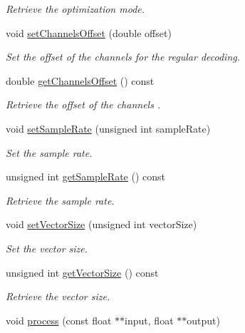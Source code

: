 \begin{DoxyCompactItemize}
\begin{DoxyCompactList}\small\item\em Retrieve the optimization mode. \end{DoxyCompactList}\item 
void \hyperlink{class_hoa2_d_1_1_kit_sources_a754292622b66c09a800213800ae611fe}{set\-Channels\-Offset} (double offset)
\begin{DoxyCompactList}\small\item\em Set the offset of the channels for the regular decoding. \end{DoxyCompactList}\item 
double \hyperlink{class_hoa2_d_1_1_kit_sources_adb0bfeeba1852f5aa3eb2890beafbf57}{get\-Channels\-Offset} () const 
\begin{DoxyCompactList}\small\item\em Retrieve the offset of the channels . \end{DoxyCompactList}\item 
void \hyperlink{class_hoa2_d_1_1_kit_sources_a8ae713ecbf98a183b49f0e796622d7a7}{set\-Sample\-Rate} (unsigned int sample\-Rate)
\begin{DoxyCompactList}\small\item\em Set the sample rate. \end{DoxyCompactList}\item 
unsigned int \hyperlink{class_hoa2_d_1_1_kit_sources_a45a8dc4fe303b07ea759d3a03f35a3f5}{get\-Sample\-Rate} () const 
\begin{DoxyCompactList}\small\item\em Retrieve the sample rate. \end{DoxyCompactList}\item 
void \hyperlink{class_hoa2_d_1_1_kit_sources_aac49dcaf933dc89769f77a665087280b}{set\-Vector\-Size} (unsigned int vector\-Size)
\begin{DoxyCompactList}\small\item\em Set the vector size. \end{DoxyCompactList}\item 
unsigned int \hyperlink{class_hoa2_d_1_1_kit_sources_a9060f1f82fbc937b8d9eb300c801dbda}{get\-Vector\-Size} () const 
\begin{DoxyCompactList}\small\item\em Retrieve the vector size. \end{DoxyCompactList}\item 
void \hyperlink{class_hoa2_d_1_1_kit_sources_ac1dd9219b7ba2eb1707f6bb84d3d5083}{process} (const float $\ast$$\ast$input, float $\ast$$\ast$output)

\end{DoxyCompactItemize}
